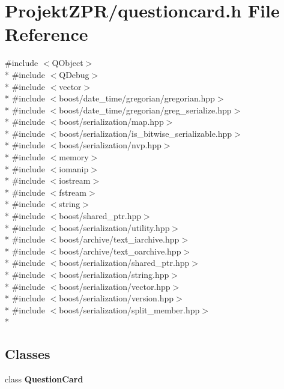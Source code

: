 \section{Projekt\-Z\-P\-R/questioncard.h File Reference}
\label{questioncard_8h}
{\ttfamily \#include $<$Q\-Object$>$}\\*
{\ttfamily \#include $<$Q\-Debug$>$}\\*
{\ttfamily \#include $<$vector$>$}\\*
{\ttfamily \#include $<$boost/date\-\_\-time/gregorian/gregorian.\-hpp$>$}\\*
{\ttfamily \#include $<$boost/date\-\_\-time/gregorian/greg\-\_\-serialize.\-hpp$>$}\\*
{\ttfamily \#include $<$boost/serialization/map.\-hpp$>$}\\*
{\ttfamily \#include $<$boost/serialization/is\-\_\-bitwise\-\_\-serializable.\-hpp$>$}\\*
{\ttfamily \#include $<$boost/serialization/nvp.\-hpp$>$}\\*
{\ttfamily \#include $<$memory$>$}\\*
{\ttfamily \#include $<$iomanip$>$}\\*
{\ttfamily \#include $<$iostream$>$}\\*
{\ttfamily \#include $<$fstream$>$}\\*
{\ttfamily \#include $<$string$>$}\\*
{\ttfamily \#include $<$boost/shared\-\_\-ptr.\-hpp$>$}\\*
{\ttfamily \#include $<$boost/serialization/utility.\-hpp$>$}\\*
{\ttfamily \#include $<$boost/archive/text\-\_\-iarchive.\-hpp$>$}\\*
{\ttfamily \#include $<$boost/archive/text\-\_\-oarchive.\-hpp$>$}\\*
{\ttfamily \#include $<$boost/serialization/shared\-\_\-ptr.\-hpp$>$}\\*
{\ttfamily \#include $<$boost/serialization/string.\-hpp$>$}\\*
{\ttfamily \#include $<$boost/serialization/vector.\-hpp$>$}\\*
{\ttfamily \#include $<$boost/serialization/version.\-hpp$>$}\\*
{\ttfamily \#include $<$boost/serialization/split\-\_\-member.\-hpp$>$}\\*
\subsection*{Classes}
\begin{DoxyCompactItemize}
\item 
class {\bf Question\-Card}
\end{DoxyCompactItemize}
